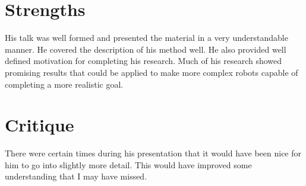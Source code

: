 \documentclass{article}
\begin{document}
\section*{Strengths}
His talk was well formed and presented the material in a very understandable manner. He covered the description of his method well. He also provided well defined motivation for completing his research. Much of his research showed promising results that could be applied to make more complex robots capable of completing a more realistic goal.
\section*{Critique}
There were certain times during his presentation that it would have been nice for him to go into slightly more detail. This would have improved some understanding that I may have missed.
\cite{goossens93}
\end{document}
